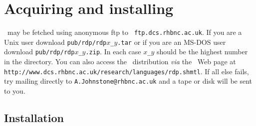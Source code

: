 \appendix
\chapter{Acquiring and installing \rdp}
\label{distribution}
\rdp\ may be fetched using anonymous ftp to {\tt
ftp.dcs.rhbnc.ac.uk}. If you are a Unix user download
\verb+pub/rdp/rdp+$x$\verb+_+$y$\verb+.tar+
or if you are an MS-DOS user download 
\verb+pub/rdp/rdp+$x$\verb+_+$y$\verb+.zip+. In each case $x$\verb+_+$y$
should be the highest number in the directory.
You can also access the \rdp\ distribution {\em via} the \rdp\ Web page
at \verb+http://www.dcs.rhbnc.ac.uk/research/languages/rdp.shmtl+.
If all else fails, try
mailing directly to \verb+A.Johnstone@rhbnc.ac.uk+ and
a tape or disk will be sent to you.

\section{Installation}
